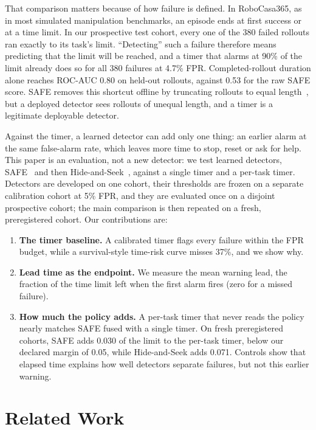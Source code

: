 \documentclass[10pt,a4paper,twocolumn]{article}
\begin{document}
That comparison matters because of how failure is defined. In RoboCasa365, as in most
simulated manipulation benchmarks, an episode ends at first success or at a time limit. In
our prospective test cohort, every one of the 380 failed rollouts ran exactly to its task's
limit. ``Detecting'' such a failure therefore means predicting that the limit will be
reached, and a timer that alarms at 90\% of the limit already does so for all 380 failures
at 4.7\% FPR. Completed-rollout duration alone reaches ROC-AUC 0.80 on held-out rollouts,
against 0.53 for the raw SAFE score. SAFE removes this shortcut offline by truncating
rollouts to equal length~\cite{gu2025safe}, but a deployed detector sees rollouts of unequal
length, and a timer is a legitimate deployable detector.

Against the timer, a learned detector can add only one thing: an earlier alarm at the same
false-alarm rate, which leaves more time to stop, reset or ask for help. This paper is an
evaluation, not a new detector: we test learned detectors, SAFE~\cite{gu2025safe} and then
Hide-and-Seek~\cite{park2026hideseek}, against a single timer and a per-task timer. Detectors are developed on one cohort, their thresholds are frozen on a separate
calibration cohort at 5\% FPR, and they are evaluated once on a disjoint prospective cohort;
the main comparison is then repeated on a fresh, preregistered cohort. Our contributions are:
\begin{enumerate}[leftmargin=*,itemsep=1pt,topsep=2pt]
  \item \textbf{The timer baseline.} A calibrated timer flags every failure within the FPR
  budget, while a survival-style time-risk curve misses 37\%, and we show why.
  \item \textbf{Lead time as the endpoint.} We measure the mean warning lead, the fraction
  of the time limit left when the first alarm fires (zero for a missed failure).
  \item \textbf{How much the policy adds.} A per-task timer that never reads the policy
  nearly matches SAFE fused with a single timer. On fresh preregistered cohorts, SAFE adds
  0.030 of the limit to the per-task timer, below our declared margin of 0.05, while
  Hide-and-Seek adds 0.071. Controls show that elapsed time explains how well detectors
  separate failures, but not this earlier warning.
\end{enumerate}

\section{Related Work}
\end{document}
